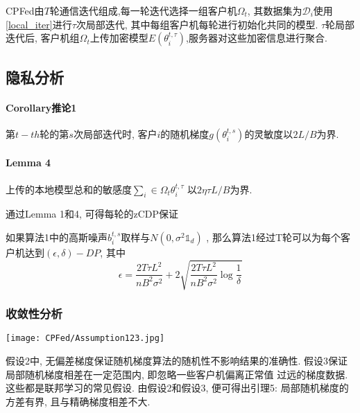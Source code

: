 CPFed由$T$轮通信迭代组成,每一轮迭代选择一组客户机$\Omega_t$, 其数据集为$\mathcal{D}_i$使用\ref{local_iter}进行$\tau$次局部迭代, 其中每组客户机每轮进行初始化共同的模型. $\tau$轮局部迭代后, 客户机组$\Omega_t$上传加密模型$E(\theta_i^{t,\tau})$,服务器对这些加密信息进行聚合.

\subsection{隐私分析}

\paragraph{Corollary推论1} 第$t-th $轮的第$s$次局部迭代时, 客户$i$的随机梯度$g(\theta_i^{t,s})$的灵敏度以$2L/B$为界. 

\paragraph{Lemma 4 } 
上传的本地模型总和的敏感度$\sum_i \in \Omega_t \theta^{t, \tau}_i$
以$2 \eta \tau L/B$为界. 

通过Lemma 1和4, 可得每轮的zCDP保证

\begin{theorem}
如果算法1中的高斯噪声$b_i^{t,s}$取样与$N(0, \sigma^2 \mathbb{1}_d)$
, 那么算法1经过T轮可以为每个客户机达到$(\epsilon,\delta)-DP$, 其中 
\begin{equation}
    \epsilon = \frac{2T\tau L^2}{n B^2 \sigma^2}+ 2 \sqrt{\frac{2T\tau L^2 }{nB^2\sigma^2} \log\frac{1}{\delta}} 
\end{equation}
\end{theorem}

\subsubsection{收敛性分析}

\begin{figure*}[!ht]
    \setlength{\abovecaptionskip}{0.1cm}
    \centering    
    \texttt{[image: CPFed/Assumption123.jpg]}
    \label{assumption123}
\end{figure*}

假设2中, 无偏差梯度保证随机梯度算法的随机性不影响结果的准确性. 
假设3保证局部随机梯度相差在一定范围内, 即忽略一些客户机偏离正常值
过远的梯度数据. 这些都是联邦学习的常见假设. 
由假设2和假设3, 便可得出引理5: 局部随机梯度的方差有界, 且与精确梯度相差不大.



